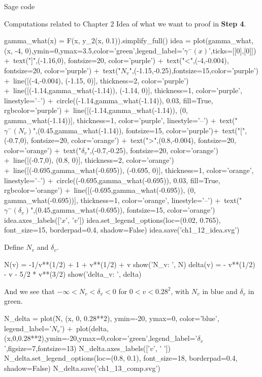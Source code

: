\documentclass[11pt, a4paper, english, twoside, notitlepage, openright]{report}
\begin{document}
\begin{chapter}{Sage code}
\begin{section}{Computations related to Chapter 2}
Idea of what we want to proof in \textbf{Step 4}.
\begin{sage}
gamma_what(x) = F(x, y_2(x, 0.1)).simplify_full()
idea = plot(gamma_what, (x, -4, 0),ymin=0,ymax=3.5,color='green',legend_label='$\gamma^-(x)$',ticks=[[0],[0]]) +\
    text("]",(-1.16,0), fontsize=20, color='purple') +\
    text("<",(-4,-0.004), fontsize=20, color='purple') +\
    text("$N_v$",(-1.15,-0.25),fontsize=15,color='purple') +\
    line([(-4,-0.004), (-1.15, 0)], thickness=2, color='purple') +\
    line([(-1.14,gamma_what(-1.14)), (-1.14, 0)], thickness=1, color='purple', linestyle='--') +\
    circle((-1.14,gamma_what(-1.14)), 0.03, fill=True, rgbcolor='purple') +\
    line([(-1.14,gamma_what(-1.14)), (0, gamma_what(-1.14))], thickness=1, color='purple', linestyle='--') +\
    text("$\gamma^-(N_v)$",(0.45,gamma_what(-1.14)), fontsize=15, color='purple')+\
    text("[",(-0.7,0), fontsize=20, color='orange') +\
    text(">",(0.8,-0.004), fontsize=20, color='orange') +\
    text("$\delta_v$",(-0.7,-0.25), fontsize=20, color='orange') +\
    line([(-0.7,0), (0.8, 0)], thickness=2, color='orange') +\
    line([(-0.695,gamma_what(-0.695)), (-0.695, 0)], thickness=1, color='orange', linestyle='--') +\
    circle((-0.695,gamma_what(-0.695)), 0.03, fill=True, rgbcolor='orange') +\
    line([(-0.695,gamma_what(-0.695)), (0, gamma_what(-0.695))], thickness=1, color='orange', linestyle='--') +\
    text("$\gamma^-(\delta_v)$",(0.45,gamma_what(-0.695)), fontsize=15, color='orange')
idea.axes_labels(['$x$', '$v$'])
idea.set_legend_options(loc=(0.02, 0.765), font_size=15, borderpad=0.4, shadow=False)
idea.save('ch1_12_idea.svg')
\end{sage}

Define $N_v$ and $\delta_v$.
\begin{sage}
N(v) = -1/v**(1/2) + 1 + v**(1/2) + v
show('N_v: ', N)
delta(v) = - v**(1/2) - v - 5/2 * v**(3/2)
show('delta_v: ', delta)
\end{sage}

And we see that $-\infty < N_v < \delta_v < 0$  for $0 < v < 0.28^2$, with $N_v$ in blue and $\delta_v$ in green.
\begin{sage}
N_delta = plot(N, (x, 0, 0.28**2), ymin=-20, ymax=0, color='blue', legend_label='$N_v$') +\
    plot(delta,(x,0,0.28**2),ymin=-20,ymax=0,color='green',legend_label='$\delta_v$',figsize=7,fontsize=13)
N_delta.axes_labels(['$v$', ' '])
N_delta.set_legend_options(loc=(0.8, 0.1), font_size=18, borderpad=0.4, shadow=False)
N_delta.save('ch1_13_comp.svg')
\end{sage}


\end{section}
\end{chapter}
\end{document}
